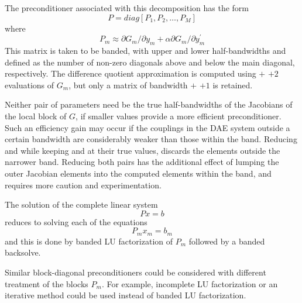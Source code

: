 The preconditioner associated with this decomposition has the form 
\begin{equation}
  P= diag[P_1, P_2, \ldots, P_M]
\end{equation}
where 
\begin{equation}
  P_m \approx \partial G_m / \partial y_m
  + \alpha \partial G_m / \partial y^\prime_m
\end{equation}
This matrix is taken to be banded, with
upper and lower half-bandwidths  and  defined as
the number of non-zero diagonals above and below the main diagonal,
respectively. The difference quotient approximation is computed using
 $+$  $+ 2$ evaluations of $G_m$, but only a matrix
of bandwidth  $+$  $+ 1$ is retained.

Neither pair of parameters need be the true half-bandwidths of the Jacobians
of the local block of $G$, if smaller values provide a more efficient
preconditioner.  Such an efficiency gain may occur if the couplings
in the DAE system outside a certain bandwidth are considerably weaker than
those within the band.  Reducing  and  while keeping
 and  at their true values, discards the elements
outside the narrower band.  Reducing both pairs has the additional
effect of lumping the outer Jacobian elements into the computed elements
within the band, and requires more caution and experimentation.

The solution of the complete linear system
\begin{equation}
  Px = b
\end{equation}
reduces to solving each of the equations 
\begin{equation}
  P_m x_m = b_m
\end{equation}
and this is done by banded LU factorization of $P_m$ followed by a banded
backsolve.

Similar block-diagonal preconditioners could be considered with different
treatment of the blocks $P_m$. For example, incomplete LU factorization or
an iterative method could be used instead of banded LU factorization.


